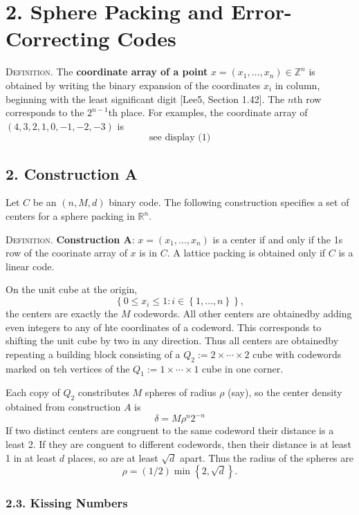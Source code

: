 \documentclass{article}
\newcommand{\Z}{\mathbb{Z}}
\newcommand{\R}{\mathbb{R}}
\newcommand{\set}[1]{\left\{ #1 \right\}}
\newcommand{\header}[1]{\noindent\textsc{#1.} }
\begin{document}
\section*{2. Sphere Packing and Error-Correcting Codes}

\header{Definition}
The \textbf{coordinate array of a point} $x = (x_1, \dots, x_n) \in \Z^n$ is obtained by writing the binary expansion of the coordinates $x_i$ in column, beginning with the least significant digit [Lee5, Section 1.42].
The $n$th row corresponds to the $2^{n-1}$th place.
For examples, the coordinate array of $(4,3,2,1,0,-1,-2,-3)$ is
$$
\text{see display (1)}
$$

\subsection*{2. Construction A}

Let $C$ be an $(n,M,d)$ binary code.
The following construction specifies a set of centers for a sphere packing in $\R^n$.

\header{Definition}
\textbf{Construction A}: $x = (x_1, \dots, x_n)$ is a center if and only if the 1s row of the coorinate array of $x$ is in $C$.
A lattice packing is obtained only if $C$ is a linear code.

On the unit cube at the origin,
$$ \set{ 0 \leq x_i \leq 1 : i \in \set{1,\dots,n} }, $$
the centers are exactly the $M$ codewords.
All other centers are obtainedby adding even integers to any of hte coordinates of a codeword.
This corresponds to shifting the unit cube by two in any direction.
Thus all centers are obtainedby repeating a building block consisting of a $Q_2 := 2 \times \cdots \times 2$ cube with codewords marked on teh vertices of the $Q_1 := 1 \times \cdots \times 1$ cube in one corner.

Each copy of $Q_2$ constributes $M$ spheres of radius $\rho$ (say), so the center density obtained from construction $A$ is
$$ \delta = M \rho^n 2^{-n} $$
If two distinct centers are congruent to the same codeword their distance is a least 2.
If they are conguent to different codewords, then their distance is at least 1 in at least $d$ places, so are at least $\sqrt d$ apart.
Thus the radius of the spheres are
$$ \rho = (1/2) \min \set{ 2, \sqrt d }. $$

\subsubsection*{2.3. Kissing Numbers}
\end{document}
